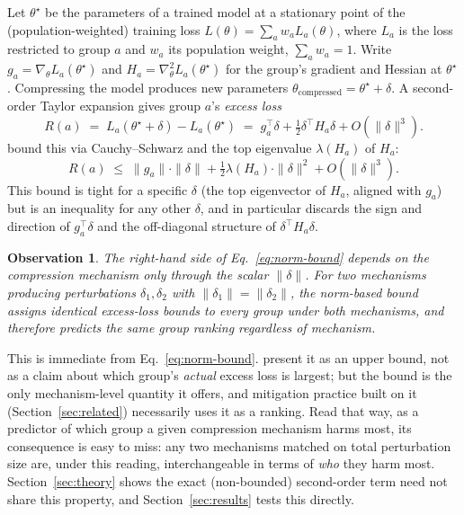 \documentclass{article}
\newtheorem{observation}{Observation}
\newcommand{\theorig}{\theta^\star}
\begin{document}
Let $\theorig$ be the parameters of a trained model at a stationary point of the (population-weighted) training loss $L(\theta) = \sum_a w_a L_a(\theta)$, where $L_a$ is the loss restricted to group $a$ and $w_a$ its population weight, $\sum_a w_a = 1$. Write $g_a = \nabla_\theta L_a(\theorig)$ and $H_a = \nabla^2_\theta L_a(\theorig)$ for the group's gradient and Hessian at $\theorig$. Compressing the model produces new parameters $\theta_{\text{compressed}} = \theorig + \delta$. A second-order Taylor expansion gives group $a$'s \emph{excess loss}
\[
R(a) \;=\; L_a(\theorig + \delta) - L_a(\theorig) \;=\; g_a^\top \delta + \tfrac{1}{2}\delta^\top H_a \delta + O(\|\delta\|^3).
\]
\citet{tran2022pruning} bound this via Cauchy--Schwarz and the top eigenvalue $\lambda(H_a)$ of $H_a$:
\begin{equation}
R(a) \;\le\; \|g_a\| \cdot \|\delta\| + \tfrac{1}{2}\lambda(H_a) \cdot \|\delta\|^2 + O(\|\delta\|^3). \label{eq:norm-bound}
\end{equation}
This bound is tight for a specific $\delta$ (the top eigenvector of $H_a$, aligned with $g_a$) but is an inequality for any other $\delta$, and in particular discards the sign and direction of $g_a^\top\delta$ and the off-diagonal structure of $\delta^\top H_a \delta$.

\begin{observation}
\label{obs:mechanism-agnostic}
The right-hand side of Eq.~\eqref{eq:norm-bound} depends on the compression mechanism \emph{only} through the scalar $\|\delta\|$. For two mechanisms producing perturbations $\delta_1, \delta_2$ with $\|\delta_1\| = \|\delta_2\|$, the norm-based bound assigns \emph{identical} excess-loss bounds to every group under both mechanisms, and therefore predicts the same group ranking regardless of mechanism.
\end{observation}

This is immediate from Eq.~\eqref{eq:norm-bound}. \citet{tran2022pruning} present it as an upper bound, not as a claim about which group's \emph{actual} excess loss is largest; but the bound is the only mechanism-level quantity it offers, and mitigation practice built on it (Section~\ref{sec:related}) necessarily uses it as a ranking. Read that way, as a predictor of which group a given compression mechanism harms most, its consequence is easy to miss: any two mechanisms matched on total perturbation size are, under this reading, interchangeable in terms of \emph{who} they harm most. Section~\ref{sec:theory} shows the exact (non-bounded) second-order term need not share this property, and Section~\ref{sec:results} tests this directly.
\end{document}
